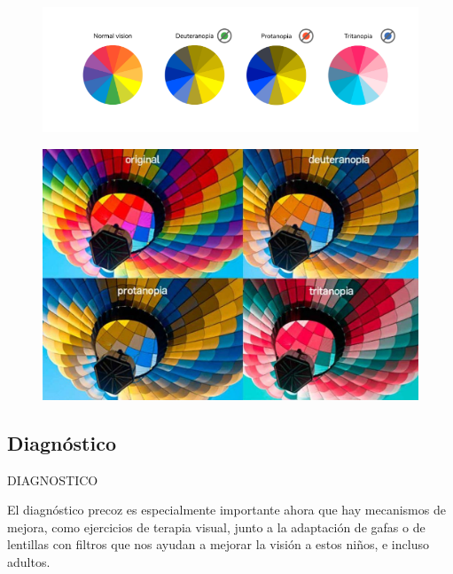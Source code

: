 \documentclass[10pt]{article}
\begin{document}
\begin{figure}[H]
	\begin{center}
\includegraphics[scale = 0.85]{Imagenes/daltonismo.png}
	\end{center} 
\end{figure}

\begin{figure}[H]
	\begin{center}
\includegraphics[scale = 0.25]{Imagenes/daltonismo2.jpg}
	\end{center} 
\end{figure}

\newpage

\subsection{Diagnóstico}

DIAGNOSTICO

El diagnóstico precoz es especialmente importante ahora que hay mecanismos de mejora, como ejercicios de terapia visual, junto a la adaptación de gafas o de lentillas con filtros que nos ayudan a mejorar la visión a estos niños, e incluso adultos\cite{IEEEreferencias:Ref26}.
\end{document}
